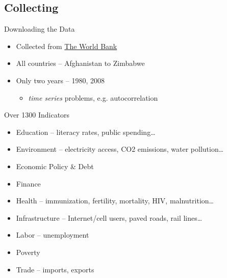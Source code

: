 \documentclass{beamer}
\begin{document}
\subsection{Collecting}

\begin{frame}{Downloading the Data}
\begin{itemize}
  \item Collected from \href{http://data.worldbank.org/indicator}{The World Bank} 
    \item All countries -- Afghanistan to Zimbabwe
      \item Only two years -- 1980, 2008
        \begin{itemize}
              \item \emph{time series} problems, e.g. autocorrelation
                \end{itemize}
\end{itemize}
\end{frame}

\begin{frame}{Over 1300 Indicators}
\begin{itemize}
  \item Education -- literacy rates, public spending\dots
    \item Environment -- electricity access, CO2 emissions, water pollution\dots
      \item Economic Policy \& Debt
        \item Finance
          \item Health -- immunization, fertility, mortality, HIV, malnutrition\dots
            \item Infrastructure -- Internet/cell users, paved roads, rail lines\dots
              \item Labor -- unemployment
                \item Poverty
                  \item Trade -- imports, exports
\end{itemize}
\end{frame}
\end{document}
